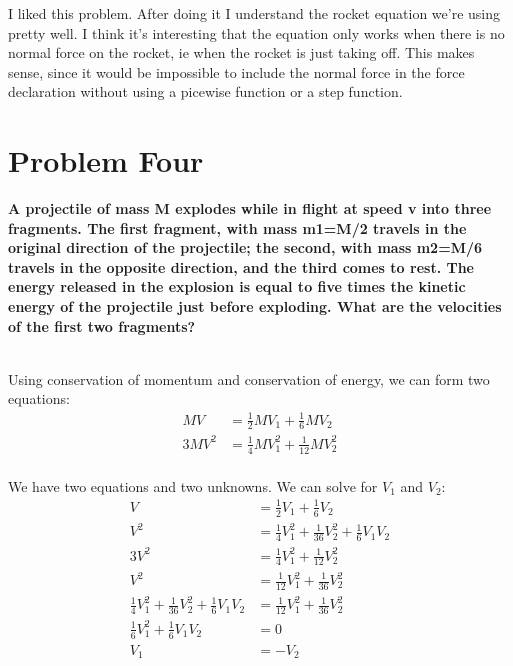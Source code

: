 \documentclass[10pt]{article} %
\begin{document}
I liked this problem. After doing it I understand the rocket equation we're using pretty well. I think it's interesting that the equation only works when there is no normal force on the rocket, ie when the rocket is just taking off. This makes sense, since it would be impossible to include the normal force in the force declaration without using a picewise function or a step function.\\

\section{Problem Four}
\textbf{A projectile of mass M explodes while in flight at speed v into three fragments. The first fragment, with mass m1=M/2 travels in the original direction of the projectile; the second, with mass m2=M/6 travels in the opposite direction, and the third comes to rest. The energy released in the explosion is equal to five times the kinetic energy of the projectile just before exploding. What are the velocities of the first two fragments?} \\ \\
\vspace{1 cm}

Using conservation of momentum and conservation of energy, we can form two equations:\\

\begin{align*}
  MV &= \frac{1}{2}MV_1 + \frac{1}{6}MV_2\\
  3MV^2 &= \frac{1}{4}MV_1^2 + \frac{1}{12}MV_2^2\\
\end{align*}

We have two equations and two unknowns. We can solve for $V_1$ and $V_2$:\\

\begin{align*}
  V &= \frac{1}{2}V_1 + \frac{1}{6}V_2\\
  V^2 &= \frac{1}{4}V_1^2 + \frac{1}{36}V_2^2 + \frac{1}{6}V_1V_2\\
  3V^2 &= \frac{1}{4}V_1^2 + \frac{1}{12}V_2^2\\
  V^2 &= \frac{1}{12}V_1^2 + \frac{1}{36}V_2^2\\
  \frac{1}{4}V_1^2 + \frac{1}{36}V_2^2 + \frac{1}{6}V_1V_2 &= \frac{1}{12}V_1^2 + \frac{1}{36}V_2^2\\
  \frac{1}{6}V_1^2 + \frac{1}{6}V_1V_2 &= 0\\
  V_1 &= -V_2\\
\end{align*}
\end{document}
